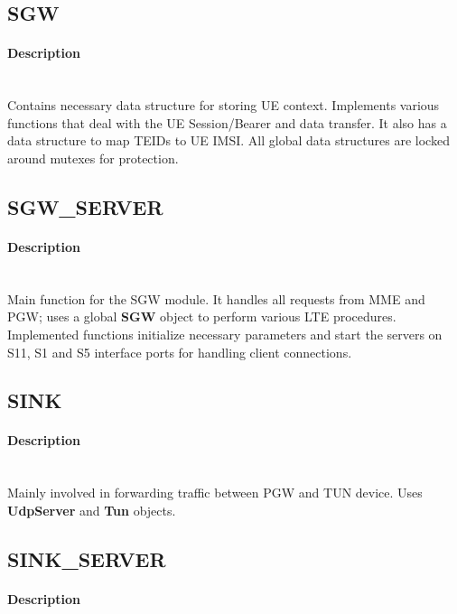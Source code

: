 \documentclass[hidelinks]{report}
\begin{document}
\subsection*{SGW}

\paragraph{Description}

~\\ Contains necessary data structure for storing UE context. Implements various functions that deal with the UE Session/Bearer and data transfer. It also has a data structure to map TEIDs to UE IMSI. All global data structures are locked around mutexes for protection.

\subsection*{SGW\_SERVER}

\paragraph*{Description}

~\\ Main function for the SGW module. It handles all requests from MME and PGW; uses a global \textbf{SGW} object to perform various LTE procedures. Implemented functions initialize necessary parameters and start the servers on S11, S1 and S5 interface ports for handling client connections.

\subsection*{SINK}

\paragraph*{Description}

~\\ Mainly involved in forwarding traffic between PGW and TUN device. Uses \textbf{UdpServer} and \textbf{Tun} objects.

\subsection*{SINK\_SERVER}

\paragraph*{Description}
\end{document}
